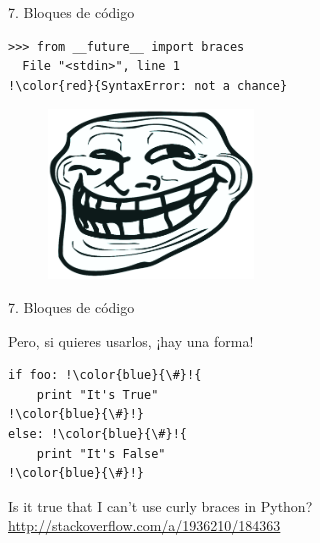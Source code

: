 \documentclass[14pt]{beamer}
\begin{document}
\begin{frame}[fragile]{7. Bloques de código}
  \begin{exampleblock}{}
    \small
    \begin{lstlisting}[escapechar=!]
>>> from __future__ import braces
  File "<stdin>", line 1
!\color{red}{SyntaxError: not a chance}
    \end{lstlisting}
  \end{exampleblock}

  \begin{figure}
    \centering
    \includegraphics[height=4.5cm]{pics/trollface.png}
  \end{figure}
\end{frame}

\begin{frame}[fragile]{7. Bloques de código}
  \begin{alertblock}{}
    \centering
    Pero, si  quieres usarlos, ¡hay una forma!
  \end{alertblock}

\begin{exampleblock}{}
    \small
    \begin{lstlisting}[escapechar=!]
if foo: !\color{blue}{\#}!{
    print "It's True"
!\color{blue}{\#}!}
else: !\color{blue}{\#}!{
    print "It's False"
!\color{blue}{\#}!}
    \end{lstlisting}
  \end{exampleblock}

  \small
  \begin{block}{\centering Is it true that I can't use curly braces in Python?}
    \centering
    \url{http://stackoverflow.com/a/1936210/184363}
  \end{block}
\end{frame}
\end{document}
